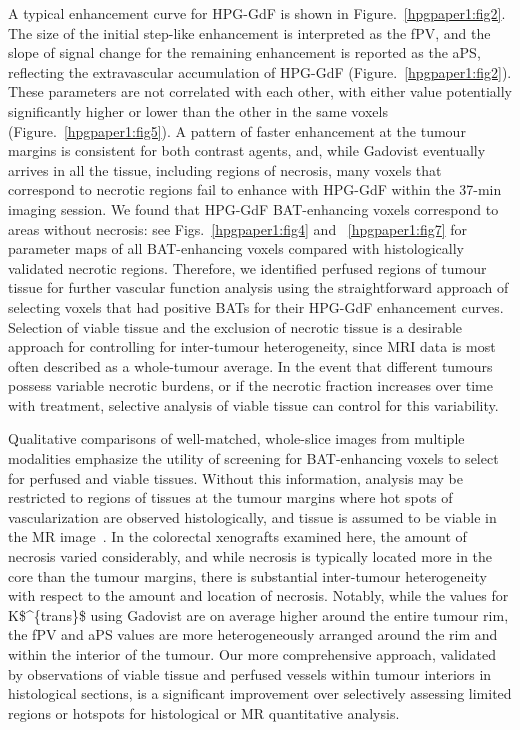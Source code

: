 A typical enhancement curve for \acs{HPG-GdF} is shown in Figure.~\ref{hpgpaper1:fig2}.
The size of the initial step-like enhancement is interpreted as the \acs{fPV}, and the slope of signal change for the remaining enhancement is reported as the \acs{aPS}, reflecting the extravascular accumulation of \acs{HPG-GdF} (Figure.~\ref{hpgpaper1:fig2}).
These parameters are not correlated with each other, with either value potentially significantly higher or lower than the other in the same voxels (Figure.~\ref{hpgpaper1:fig5}).
A pattern of faster enhancement at the tumour margins is consistent for both contrast agents, and, while Gadovist eventually arrives in all the tissue, including regions of necrosis, many voxels that correspond to necrotic regions fail to enhance with \acs{HPG-GdF} within the 37-min imaging session.
We found that \acs{HPG-GdF} \acs{BAT}-enhancing voxels correspond to areas without necrosis: see Figs.~\ref{hpgpaper1:fig4} and ~\ref{hpgpaper1:fig7} for parameter maps of all \acs{BAT}-enhancing voxels compared with histologically validated necrotic regions.
Therefore, we identified perfused regions of tumour tissue for further vascular function analysis using the straightforward approach of selecting voxels that had positive \acs{BAT}s for their \acs{HPG-GdF} enhancement curves.
Selection of viable tissue and the exclusion of necrotic tissue is a desirable approach for controlling for inter-tumour heterogeneity, since MRI data is most often described as a whole-tumour average.
In the event that different tumours possess variable necrotic burdens, or if the necrotic fraction increases over time with treatment, selective analysis of viable tissue can control for this variability.

Qualitative comparisons of well-matched, whole-slice images from multiple modalities emphasize the utility of screening for \acs{BAT}-enhancing voxels to select for perfused and viable tissues.
Without this information, analysis may be restricted to regions of tissues at the tumour margins where hot spots of vascularization are observed histologically, and tissue is assumed to be viable in the MR image~\cite{Pathak:2005gu,Li:2005gw}.
In the colorectal xenografts examined here, the amount of necrosis varied considerably, and while necrosis is typically located more in the core than the tumour margins, there is substantial inter-tumour heterogeneity with respect to the amount and location of necrosis.
Notably, while the values for \acs{K$^{trans}$} using Gadovist are on average higher around the entire tumour rim, the \acs{fPV} and \acs{aPS} values are more heterogeneously arranged around the rim and within the interior of the tumour.
Our more comprehensive approach, validated by observations of viable tissue and perfused vessels within tumour interiors in histological sections, is a significant improvement over selectively assessing limited regions or hotspots for histological or MR quantitative analysis.

